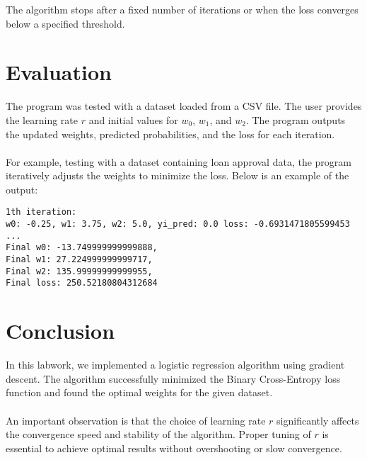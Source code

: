 \documentclass{article}
\begin{document}
The algorithm stops after a fixed number of iterations or when the loss converges below a specified threshold.

\section{Evaluation}

The program was tested with a dataset loaded from a CSV file. The user provides the learning rate $r$ 
and initial values for $w_0$, $w_1$, and $w_2$. The program outputs the updated weights, predicted 
probabilities, and the loss for each iteration.\\
\\
For example, testing with a dataset containing loan approval data, the program iteratively adjusts the 
weights to minimize the loss. Below is an example of the output:

\begin{verbatim}
1th iteration:
w0: -0.25, w1: 3.75, w2: 5.0, yi_pred: 0.0 loss: -0.6931471805599453
...
Final w0: -13.749999999999888, 
Final w1: 27.224999999999717, 
Final w2: 135.99999999999955, 
Final loss: 250.52180804312684
\end{verbatim}

\section{Conclusion}

In this labwork, we implemented a logistic regression algorithm using gradient descent. The algorithm 
successfully minimized the Binary Cross-Entropy loss function and found the optimal weights for the 
given dataset.\\
\\
An important observation is that the choice of learning rate $r$ significantly affects the convergence 
speed and stability of the algorithm. Proper tuning of $r$ is essential to achieve optimal results 
without overshooting or slow convergence.
\end{document}
